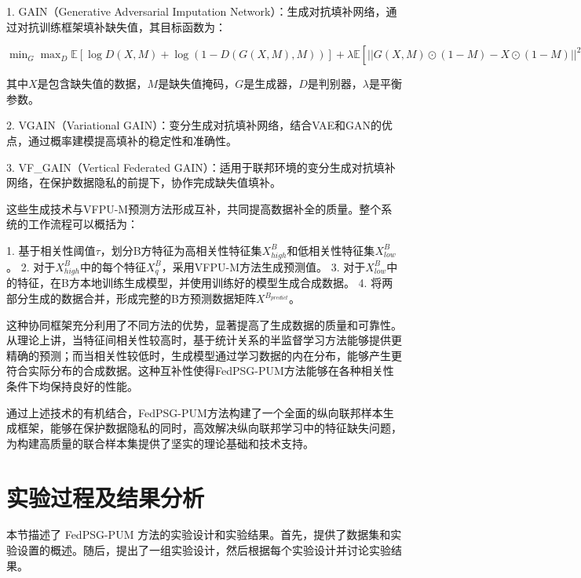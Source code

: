 1. GAIN（Generative Adversarial Imputation Network）：生成对抗填补网络，通过对抗训练框架填补缺失值，其目标函数为：

$\min_G \max_D \mathbb{E}[\log D(X, M) + \log(1 - D(G(X, M), M))] + \lambda \mathbb{E}[||G(X, M) \odot (1-M) - X \odot (1-M)||^2]$

其中$X$是包含缺失值的数据，$M$是缺失值掩码，$G$是生成器，$D$是判别器，$\lambda$是平衡参数。

2. VGAIN（Variational GAIN）：变分生成对抗填补网络，结合VAE和GAN的优点，通过概率建模提高填补的稳定性和准确性。

3. VF\_GAIN（Vertical Federated GAIN）：适用于联邦环境的变分生成对抗填补网络，在保护数据隐私的前提下，协作完成缺失值填补。

这些生成技术与VFPU-M预测方法形成互补，共同提高数据补全的质量。整个系统的工作流程可以概括为：

1. 基于相关性阈值$\tau$，划分B方特征为高相关性特征集$X^B_{high}$和低相关性特征集$X^B_{low}$。
2. 对于$X^B_{high}$中的每个特征$X^B_q$，采用VFPU-M方法生成预测值。
3. 对于$X^B_{low}$中的特征，在B方本地训练生成模型，并使用训练好的模型生成合成数据。
4. 将两部分生成的数据合并，形成完整的B方预测数据矩阵$X^{B_{predict}}$。

这种协同框架充分利用了不同方法的优势，显著提高了生成数据的质量和可靠性。从理论上讲，当特征间相关性较高时，基于统计关系的半监督学习方法能够提供更精确的预测；而当相关性较低时，生成模型通过学习数据的内在分布，能够产生更符合实际分布的合成数据。这种互补性使得FedPSG-PUM方法能够在各种相关性条件下均保持良好的性能。

通过上述技术的有机结合，FedPSG-PUM方法构建了一个全面的纵向联邦样本生成框架，能够在保护数据隐私的同时，高效解决纵向联邦学习中的特征缺失问题，为构建高质量的联合样本集提供了坚实的理论基础和技术支持。


\section{实验过程及结果分析}
本节描述了 FedPSG-PUM 方法的实验设计和实验结果。首先，提供了数据集和实验设置的概述。随后，提出了一组实验设计，然后根据每个实验设计并讨论实验结果。
